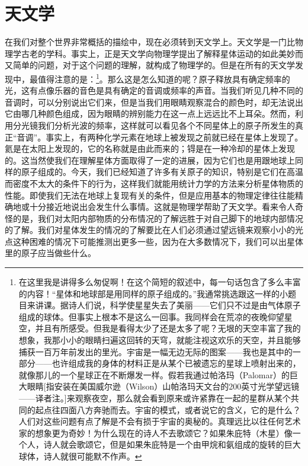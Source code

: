 \documentclass[12pt,oneside]{book}
\begin{document}
\section{天文学}
在我们对整个世界非常概括的描绘中，现在必须转到天文学上。天文学是一门比物理学古老的学科。事实上，正是天文学向物理学提出了解释星体运动的如此美妙而又简单的问题，对于这个问题的理解，就构成了物理学的。但是在所有的天文学发现中，最值得注意的是：\footnote{在这里我是讲得多么匆促啊！在这个简短的叙述中，每一句话包含了多么丰富的内容！“星体和地球部是用同样的原子组成的。”我通常挑选跟这一样的小题目来讲课。据诗人们说，科学使星星失去了美丽——它们只不过是由气体原子组成的球体。但事实上根本不是这么一回事。我同样会在荒凉的夜晚仰望星空，并且有所感受。但我是看得太少了还是太多了呢？无垠的天空丰富了我的想象，我那小小的眼睛扫遍这回转的天穹，就能注视这欢乐的天空，并且能够捕获一百万年前发出的里光。宇宙是一幅无边无际的图案——我也是其中的一部分——也许组成我的身体的材料正是从某个已被遗忘的星球上喷射出来的，就像那儿的一个星球正在不断爆发一样。假若我通过帕洛玛（Palomar）的巨大眼睛[指安装在美国威尔逊（Wilson）山帕洛玛天文台的200英寸光学望远镜——译者注。]来观察夜空，那么就会看到原来或许紧靠在一起的星群从某个共同的起点往四面八方奔驰而去。宇宙的模式，或者说它的含义，它的是什么？人们对这些问题有点了解是不会有损于宇宙的奥秘的。真理远比以往任何艺术家的想象更为奇妙！为什么现在的诗人不去歌颂它？如果朱庇特（木星）像一个人，诗人就会歌颂它，但是如果朱庇特是一个由甲烷和氨组成的旋转的巨大球体，诗人就很可能默不作声。}。那么这是怎么知道的呢？原子释放具有确定频率的光，这有点像乐器的音色是具有确定的音调或频率的声音。当我们听见几种不同的音调时，可以分别说出它们来，但是当我们用眼睛观察混合的颜色时，却无法说出它由哪几种颜色组成，因为眼睛的辨别能力在这一点上远远比不上耳朵。然而，利用分光镜我们分析光波的频率，这样就可以看见各个不同星体上的原子所发生的真正“音调”。事实上，有两种化学元素在地球上被发现之前就已经在星体上发现了。氦是在太阳上发现的，它的名称就是由此而来的；锝是在一种冷却的星体上发现的。这当然使我们在理解星体方面取得了一定的进展，因为它们也是用跟地球上同样的原子组成的。今天，我们已经知道了许多有关原子的知识，特别是它们在高温而密度不太大的条件下的行为，这样我们就能用统计力学的方法来分析星体物质的性能。即使我们无法在地球上复现有关的条件，但是应用基本的物理定律往往能精确地或十分接近地说出会发生什么事情。这就是物理学帮助了天文学。看来令人奇怪的是，我们对太阳内部物质的分布情况的了解远胜于对自己脚下的地球内部情况的了解。我们对星体发生的情况的了解要比在人们必须通过望远镜来观察小小的光点这种困难的情况下可能推测出更多一些，因为在大多数情况下，我们可以出星体里的原子应当做些什么。
\end{document}
